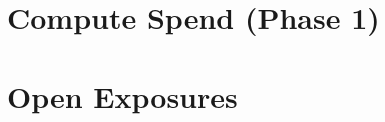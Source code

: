 \documentclass[11pt]{article}
\begin{document}
\section{Compute Spend (Phase 1)}
\label{app:compute}


\section{Open Exposures}
\label{app:exposures}

\end{document}
